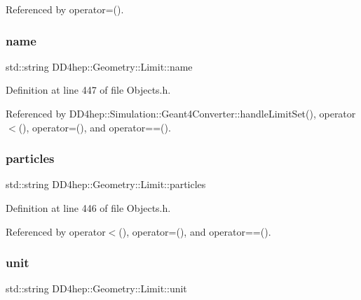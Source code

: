 Referenced by operator=().

\hypertarget{class_d_d4hep_1_1_geometry_1_1_limit_ad1cec0ce58b0158ef8ba97d0a066cb28}{}\label{class_d_d4hep_1_1_geometry_1_1_limit_ad1cec0ce58b0158ef8ba97d0a066cb28} 
\subsubsection{\texorpdfstring{name}{name}}
{\footnotesize\ttfamily std\+::string D\+D4hep\+::\+Geometry\+::\+Limit\+::name}



Definition at line 447 of file Objects.\+h.



Referenced by D\+D4hep\+::\+Simulation\+::\+Geant4\+Converter\+::handle\+Limit\+Set(), operator$<$(), operator=(), and operator==().

\hypertarget{class_d_d4hep_1_1_geometry_1_1_limit_a44351a38f5e876a67898568c5ca4d4a6}{}\label{class_d_d4hep_1_1_geometry_1_1_limit_a44351a38f5e876a67898568c5ca4d4a6} 
\subsubsection{\texorpdfstring{particles}{particles}}
{\footnotesize\ttfamily std\+::string D\+D4hep\+::\+Geometry\+::\+Limit\+::particles}



Definition at line 446 of file Objects.\+h.



Referenced by operator$<$(), operator=(), and operator==().

\hypertarget{class_d_d4hep_1_1_geometry_1_1_limit_a60bf4c5f1e2847c0dde17d54abaffffb}{}\label{class_d_d4hep_1_1_geometry_1_1_limit_a60bf4c5f1e2847c0dde17d54abaffffb} 
\subsubsection{\texorpdfstring{unit}{unit}}
{\footnotesize\ttfamily std\+::string D\+D4hep\+::\+Geometry\+::\+Limit\+::unit}




